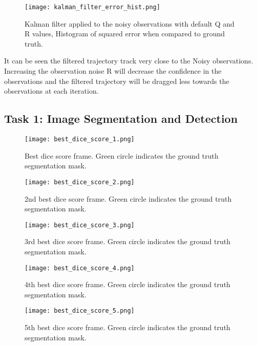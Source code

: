 \documentclass{report}
\begin{document}
\begin{figure}
    \centering
    \texttt{[image: kalman\_filter\_error\_hist.png]}
    \caption{Kalman filter applied to the noisy observations with default Q and R values, Histogram of squared error when compared to ground truth.}
    \label{fig:kalman_filter_error_hist}
\end{figure}


It can be seen the filtered trajectory track very close to the Noisy observations. Increasing the observation noise R will decrease the confidence in the observations and the filtered trajectory will be dragged less towards the observations at each iteration.


\printbibliography

\begin{appendices}

\chapter{Task 1: Image Segmentation and Detection}\label{sec:app_task1}


\begin{figure}
    \centering
    \texttt{[image: best\_dice\_score\_1.png]}
    \caption{Best dice score frame. Green circle indicates the ground truth segmentation mask.}
\end{figure}
\begin{figure}
    \centering
    \texttt{[image: best\_dice\_score\_2.png]}
    \caption{2nd best dice score frame. Green circle indicates the ground truth segmentation mask.}
\end{figure}
\begin{figure}
    \centering
    \texttt{[image: best\_dice\_score\_3.png]}
    \caption{3rd best dice score frame. Green circle indicates the ground truth segmentation mask.}
\end{figure}
\begin{figure}
    \centering
    \texttt{[image: best\_dice\_score\_4.png]}
    \caption{4th best dice score frame. Green circle indicates the ground truth segmentation mask.}
\end{figure}
\begin{figure}
    \centering
    \texttt{[image: best\_dice\_score\_5.png]}
    \caption{5th best dice score frame. Green circle indicates the ground truth segmentation mask.}
\end{figure}


\end{appendices}
\end{document}
